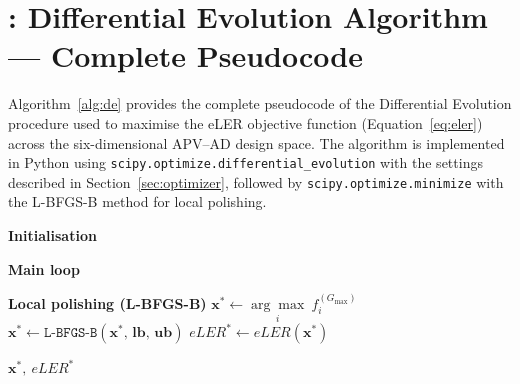 

\section{: Differential Evolution Algorithm — Complete Pseudocode}
\label{app:de}

\hspace{1cm}Algorithm~\ref{alg:de} provides the complete pseudocode
of the Differential Evolution procedure used to maximise the eLER
objective function (Equation~\ref{eq:eler}) across the six-dimensional
APV--AD design space. The algorithm is implemented in Python using
\texttt{scipy.optimize.differential\_evolution} with the settings
described in Section~\ref{sec:optimizer}, followed by
\texttt{scipy.optimize.minimize} with the L-BFGS-B method for local
polishing.


\begin{algorithm}[H]
	\DontPrintSemicolon
	\SetAlgoLined
	\small
	\caption{Differential Evolution for APV--AD eLER maximisation}
	\label{alg:de}
	
	
	\textbf{Initialisation}\;
	
	\textbf{Main loop}\;
	
	\BlankLine
	\textbf{Local polishing (L-BFGS-B)}\;
	$\mathbf{x}^* \leftarrow
	\underset{i}{\arg\max}\ f_i^{(G_{\max})}$\;
	$\mathbf{x}^* \leftarrow
	\texttt{L-BFGS-B}\!\left(\mathbf{x}^*,\,
	\mathbf{lb},\,\mathbf{ub}\right)$\;
	$eLER^* \leftarrow eLER(\mathbf{x}^*)$\;
	
	\Return $\mathbf{x}^*,\ eLER^*$\;
	
\end{algorithm}

